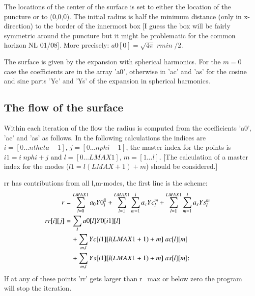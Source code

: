 \documentclass[11pt,a4paper,twoside]{article}
\begin{document}
The locations of the center of the surface is set to either the location of 
the puncture or to (0,0,0). The initial radius is half the minimum distance (only in x-direction) 
to the border of the innermost box [I guess the box will be
fairly symmetric around the puncture \warningsymbol but it might be problematic for 
the common horizon NL 01/08].
More precisely: $a0[0]=\sqrt{4 \pi} \;rmin\; /2$.

The surface is given by the expansion with spherical harmonics. For the
$m=0$ case the coefficients are in the array 'a0', otherwise in 'ac' and 'as' for the 
cosine and sine parts 'Yc' and 'Ys' of the expansion in spherical harmonics.

\subsection{The flow of the surface}
Within each iteration of the flow the radius is computed from the 
coefficients 'a0', 'ac' and 'as' as follows.
In the following calculations the indices are $i=[0\dots ntheta-1]$, 
$j=[0\dots nphi-1]$, the master index for the points is $i1=i \; nphi+j$ and 
$l=[0\dots LMAX1]$, $m=[1\dots l]$. [The calculation of a master index for 
the modes ($l1=l (LMAX+1) +m$) should be considered.]

rr has contributions from all l,m-modes, the first line is the scheme:
\begin{align}
  r &= \sum_{l=0}^{LMAX1} a_0 Y0^0_l +\sum_{l=1}^{LMAX1} \sum_{m=1}^{l} a_c Yc^m_l 
                                     +\sum_{l=1}^{LMAX1} \sum_{m=1}^{l} a_s Ys^m_l \\
  rr[i][j] &= \sum_{l} a0[l] Y0[i1][l]\notag \\ 
  &\quad+\sum_{m,l} Yc[i1][l (LMAX1+1)+m] \; ac[l][m] \notag \\
  &\quad + \sum_{m,l} Ys[i1][l (LMAX1+1)+m] \; as[l][m];
\end{align}
If at any of these points 'rr' gets larger than r\_max or below zero 
the program will stop the iteration.
\end{document}
